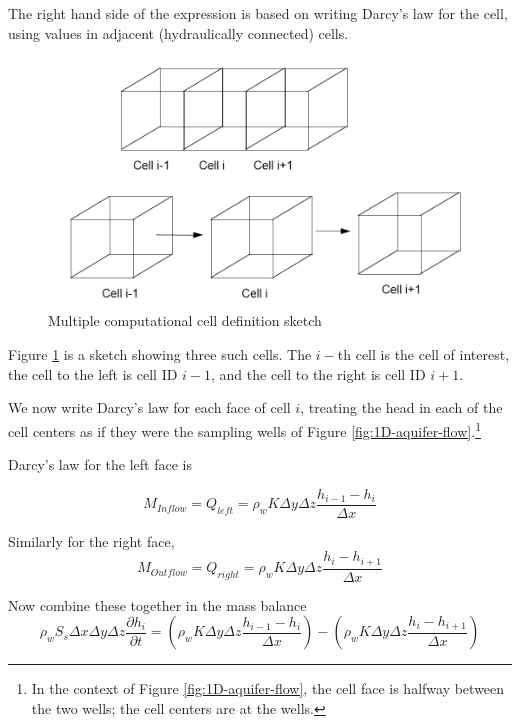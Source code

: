 The right hand side of the expression is based on writing Darcy's law for the cell, using values in adjacent (hydraulically connected) cells.

\begin{figure}[h!] %
   \centering
   \includegraphics[width=6in]{./16-PorousMediumFlow/multiple-computational-cell.jpg} 
   \caption{Multiple computational cell definition sketch}
   \label{fig:multiple-computational-cell}
\end{figure}

Figure \ref{fig:multiple-computational-cell} is a sketch showing three such cells.  
The $i-$th cell is the cell of interest, the cell to the left is cell ID $i-1$, and the cell to the right is cell ID $i+1$.  

We now write Darcy's law for each face of cell $i$, treating the head in each of the cell centers as if they were the sampling wells of Figure \ref{fig:1D-aquifer-flow}.\footnote{In the context of Figure \ref{fig:1D-aquifer-flow}, the cell face is halfway between the two wells; the cell centers are at the wells.}

Darcy's law for the left face is 

\begin{equation}
M_{Inflow} = Q_{left} =\rho_{w} K \Delta y \Delta z \frac{h_{i-1} - h_{i}}{\Delta x}
\end{equation}
 
Similarly for the right face, 
 \begin{equation}
M_{Outflow} = Q_{right} =\rho_{w} K \Delta y \Delta z \frac{h_{i} - h_{i+1}}{\Delta x}
\end{equation}

Now combine these together in the mass balance
 \begin{equation}
\rho_{w} S_{s} \Delta x \Delta y \Delta z \frac{\partial h_i}{\partial t} = 
(\rho_{w} K \Delta y \Delta z \frac{h_{i-1} - h_{i}}{\Delta x}) - 
(\rho_{w} K \Delta y \Delta z \frac{h_{i} - h_{i+1}}{\Delta x})
\end{equation}

